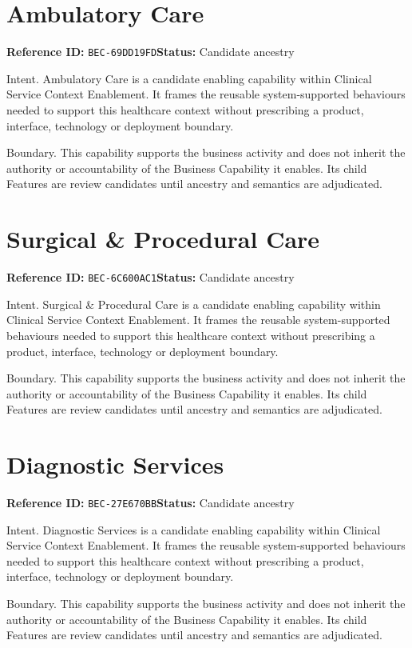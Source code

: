 \documentclass[11pt,a4paper,openany]{book}
\begin{document}
\section{Ambulatory Care}\label{cap:bec-69dd19fd}
\noindent\textbf{Reference ID:} \texttt{BEC-69DD19FD}\quad \textbf{Status:} Candidate ancestry\par
Intent. Ambulatory Care is a candidate enabling capability within Clinical Service Context Enablement. It frames the reusable system-supported behaviours needed to support this healthcare context without prescribing a product, interface, technology or deployment boundary.

Boundary. This capability supports the business activity and does not inherit the authority or accountability of the Business Capability it enables. Its child Features are review candidates until ancestry and semantics are adjudicated.

\section{Surgical \& Procedural Care}\label{cap:bec-6c600ac1}
\noindent\textbf{Reference ID:} \texttt{BEC-6C600AC1}\quad \textbf{Status:} Candidate ancestry\par
Intent. Surgical \& Procedural Care is a candidate enabling capability within Clinical Service Context Enablement. It frames the reusable system-supported behaviours needed to support this healthcare context without prescribing a product, interface, technology or deployment boundary.

Boundary. This capability supports the business activity and does not inherit the authority or accountability of the Business Capability it enables. Its child Features are review candidates until ancestry and semantics are adjudicated.

\section{Diagnostic Services}\label{cap:bec-27e670bb}
\noindent\textbf{Reference ID:} \texttt{BEC-27E670BB}\quad \textbf{Status:} Candidate ancestry\par
Intent. Diagnostic Services is a candidate enabling capability within Clinical Service Context Enablement. It frames the reusable system-supported behaviours needed to support this healthcare context without prescribing a product, interface, technology or deployment boundary.

Boundary. This capability supports the business activity and does not inherit the authority or accountability of the Business Capability it enables. Its child Features are review candidates until ancestry and semantics are adjudicated.
\end{document}
